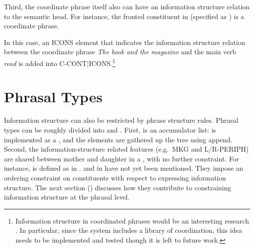 \noindent Third, the coordinate phrase itself also can have an
information structure relation to the semantic head. For instance, the
fronted constituent in  (specified as
) is a coordinate phrase.  





\noindent In this case, an ICONS
element that indicates the information structure relation between the
coordinate phrase \textit{The book and the magazine} and the main verb
\textit{read} is added into C-CONT{$\mid$}ICONS.\footnote{Information
  structure in coordinated phrases would be an interesting research
  . In particular, since the 
  \lingo {} system includes a
  library of coordination, this idea needs to be implemented and
  tested though it is left to future work.}




























\section{Phrasal Types}
\label{10:sec:monoclausal}


Information structure can also be restricted by phrase structure
rules.  Phrasal types can be roughly divided into 
and . First,  is an accumulator list:
 is implemented as a , and the elements are
gathered up the tree using  append. Second, the
information-structure related features (e.g.\ MKG and
L/R-PERIPH) are shared between mother and daughter in a
, with no further
constraint. For instance, 
is defined as in .  and 
in  have not yet been mentioned. They impose an
ordering constraint on constituents with respect to expressing
information structure. The next section ()
discusses how they contribute to constraining information structure at
the phrasal level.


